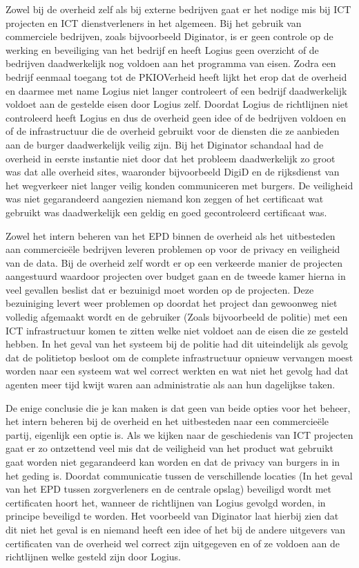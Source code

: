 Zowel bij de overheid zelf als bij externe bedrijven gaat er het nodige mis bij ICT projecten en ICT dienstverleners in het algemeen. Bij het gebruik van commerciele bedrijven, zoals bijvoorbeeld Diginator, is er geen controle op de werking en beveiliging van het bedrijf en heeft Logius geen overzicht of de bedrijven daadwerkelijk nog voldoen aan het programma van eisen. Zodra een bedrijf eenmaal toegang tot de PKIOVerheid heeft lijkt het erop dat de overheid en daarmee met name Logius niet langer controleert of een bedrijf daadwerkelijk voldoet aan de gestelde eisen door Logius zelf. Doordat Logius de richtlijnen niet controleerd heeft Logius en dus de overheid geen idee of de bedrijven voldoen en of de infrastructuur die de overheid gebruikt voor de diensten die ze aanbieden aan de burger daadwerkelijk veilig zijn. Bij het Diginator schandaal had de overheid in eerste instantie niet door dat het probleem daadwerkelijk zo groot was dat alle overheid sites, waaronder bijvoorbeeld DigiD en de rijksdienst van het wegverkeer niet langer veilig konden communiceren met burgers. De veiligheid was niet gegarandeerd aangezien niemand kon zeggen of het certificaat wat gebruikt was daadwerkelijk een geldig en goed gecontroleerd certificaat was.

Zowel het intern beheren van het EPD binnen de overheid als het uitbesteden aan commercie\"{e}le bedrijven leveren problemen op voor de privacy en veiligheid van de data. Bij de overheid zelf wordt er op een verkeerde manier de projecten aangestuurd waardoor projecten over budget gaan en de tweede kamer hierna in veel gevallen beslist dat er bezuinigd moet worden op de projecten. Deze bezuiniging levert weer problemen op doordat het project dan gewoonweg niet volledig afgemaakt wordt en de gebruiker (Zoals bijvoorbeeld de politie) met een ICT infrastructuur komen te zitten welke niet voldoet aan de eisen die ze gesteld hebben. In het geval van het systeem bij de politie had dit uiteindelijk als gevolg dat de politietop besloot om de complete infrastructuur opnieuw vervangen moest worden naar een systeem wat wel correct werkten en wat niet het gevolg had dat agenten meer tijd kwijt waren aan administratie als aan hun dagelijkse taken.

De enige conclusie die je kan maken is dat geen van beide opties voor het beheer, het intern beheren bij de overheid en het uitbesteden naar een commercie\"{e}le partij, eigenlijk een optie is. Als we kijken naar de geschiedenis van ICT projecten gaat er zo ontzettend veel mis dat de veiligheid van het product wat gebruikt gaat worden niet gegarandeerd kan worden en dat de privacy van burgers in in het geding is. Doordat communicatie tussen de verschillende locaties (In het geval van het EPD tussen zorgverleners en de centrale opslag) beveiligd wordt met certificaten hoort het, wanneer de richtlijnen van Logius gevolgd worden, in principe beveiligd te worden. Het voorbeeld van Diginator laat hierbij zien dat dit niet het geval is en niemand heeft een idee of het bij de andere uitgevers van certificaten van de overheid wel correct zijn uitgegeven en of ze voldoen aan de richtlijnen welke gesteld zijn door Logius.

